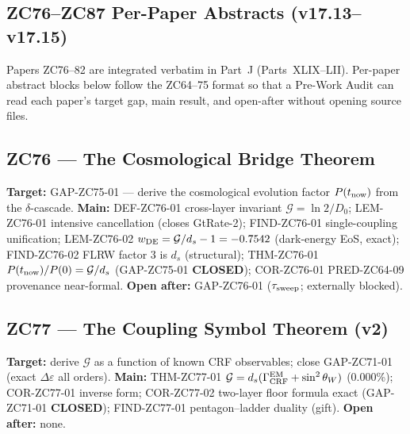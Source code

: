 \documentclass[11pt, a4paper]{article}
\begin{document}
\newpage

\subsection*{ZC76--ZC87 Per-Paper Abstracts (v17.13--v17.15)}

\begin{contentsbox}[title={Per-Paper Registry --- Format Note}]
Papers ZC76--82 are integrated verbatim in Part~J (Parts~XLIX--LII).
Per-paper abstract blocks below follow the ZC64--75 format so that a
Pre-Work Audit can read each paper's target gap, main result, and
open-after without opening source files.
\end{contentsbox}

\subsection{ZC76 --- The Cosmological Bridge Theorem}

\begin{zcbox}[title={ZC76: THM-ZC76-01 --- Cosmological Bridge (Exact)}]
\sloppy
\textbf{Target:} GAP-ZC75-01 --- derive the cosmological evolution
factor $P(t_{\rm now})$ from the $\delta$-cascade.
\textbf{Main:} DEF-ZC76-01 cross-layer invariant
$\mathcal{G}=\ln2/D_0$; LEM-ZC76-01 intensive cancellation (closes
GtRate-2); FIND-ZC76-01 single-coupling unification;
LEM-ZC76-02 $w_{\rm DE}=\mathcal{G}/d_s-1=-0.7542$ (dark-energy EoS,
exact); FIND-ZC76-02 FLRW factor $3$ is $d_s$ (structural);
THM-ZC76-01 $P(t_{\rm now})/P(0)=\mathcal{G}/d_s$ (GAP-ZC75-01
\textbf{CLOSED}); COR-ZC76-01 PRED-ZC64-09 provenance near-formal.
\textbf{Open after:} GAP-ZC76-01 ($\tau_{\rm sweep}$; externally blocked).
\end{zcbox}

\subsection{ZC77 --- The Coupling Symbol Theorem (v2)}

\begin{zcbox}[title={ZC77: THM-ZC77-01 --- Coupling Symbol (Exact)}]
\sloppy
\textbf{Target:} derive $\mathcal{G}$ as a function of known CRF
observables; close GAP-ZC71-01 (exact $\Delta\varepsilon$ all orders).
\textbf{Main:} THM-ZC77-01 $\mathcal{G}=d_s(\Gamma_{\rm CRF}^{\rm EM}
+\sin^2\theta_W)$ (0.000\%); COR-ZC77-01 inverse form; COR-ZC77-02
two-layer floor formula exact (GAP-ZC71-01 \textbf{CLOSED});
FIND-ZC77-01 pentagon--ladder duality (gift).
\textbf{Open after:} none.
\end{zcbox}
\end{document}
